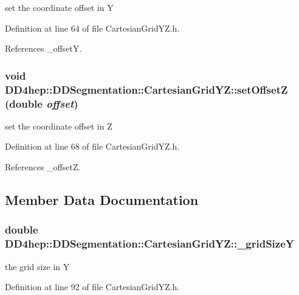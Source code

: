 set the coordinate offset in Y 

Definition at line 64 of file CartesianGridYZ.h.

References \_\-offsetY.\hypertarget{class_d_d4hep_1_1_d_d_segmentation_1_1_cartesian_grid_y_z_a396883c33c1eb30aac6e5dc2c21a7f66}{
\subsubsection[{setOffsetZ}]{\setlength{\rightskip}{0pt plus 5cm}void DD4hep::DDSegmentation::CartesianGridYZ::setOffsetZ (double {\em offset})}}
\label{class_d_d4hep_1_1_d_d_segmentation_1_1_cartesian_grid_y_z_a396883c33c1eb30aac6e5dc2c21a7f66}


set the coordinate offset in Z 

Definition at line 68 of file CartesianGridYZ.h.

References \_\-offsetZ.

\subsection{Member Data Documentation}
\hypertarget{class_d_d4hep_1_1_d_d_segmentation_1_1_cartesian_grid_y_z_ac1bd277d62423bb439394096d82a0ea4}{
\subsubsection[{\_\-gridSizeY}]{\setlength{\rightskip}{0pt plus 5cm}double {\bf DD4hep::DDSegmentation::CartesianGridYZ::\_\-gridSizeY}}}
\label{class_d_d4hep_1_1_d_d_segmentation_1_1_cartesian_grid_y_z_ac1bd277d62423bb439394096d82a0ea4}


the grid size in Y 

Definition at line 92 of file CartesianGridYZ.h.

